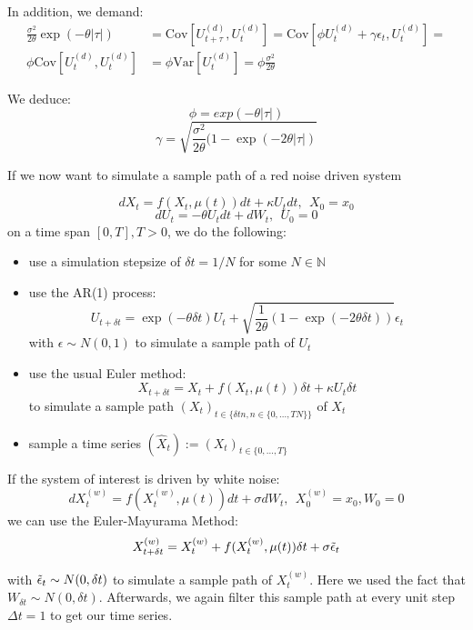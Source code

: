 \documentclass[%
thesis=student,%
coverpage=false,%
titlepage=false,%
headmarks=true, %
english,%
font=libertine, %
math=newpxtx, %
BCOR=5mm,%
coverBCOR=11mm%
]{tumbook}
\begin{document}
In addition, we demand: 
  \begin{align*} 
      \frac{\sigma ^2}{2\theta}\exp(-\theta\lvert \tau \rvert) &= \text{Cov}[U_{t+\tau} ^{(d)},U_{t} ^{(d)}] = \text{Cov}[\phi U_{t} ^{(d)} + \gamma \epsilon_{t}, U_{t}^{(d)}] = \\
      \phi\text{Cov}[U_{t}^{(d)},U_{t}^{(d)}] &= \phi \text{Var}[U_{t}^{(d)}] = \phi \frac{\sigma^2}{2\theta}
  \end{align*}




We deduce: 
    \[
        \phi = exp(-\theta \lvert \tau \rvert)
    \]
    \[
        \gamma = \sqrt{\frac{\sigma^{2}}{2\theta}(1-\exp(-2\theta \lvert \tau \rvert)}
    \]

If we now want to simulate a sample path of a red noise driven system

\[ 
     dX_{t} = f(X_{t},\mu(t))dt + \kappa U_{t}dt,\ \  X_{0} = x_{0}
\]
\[
     dU_{t} = -\theta U_{t}dt + dW_{t},\ \ U_{0} = 0
\]
on a time span $[0,T], T > 0$, we do the following: 
\begin{itemize}
    \item use a simulation stepsize of $\delta t = 1/N$ for some $N \in \mathbb{N}$
    \item use the AR(1) process:
    \[
    U_{t+\delta t} = \exp(-\theta \delta t)U_{t} + \sqrt{\frac{1}{2\theta}(1-\exp(-2\theta \delta t))}\epsilon_{t}
    \]
    with $\epsilon \sim N(0,1)$ to simulate a sample path of $U_{t}$
    \item use the usual Euler method:
    \[
        X_{t+\delta t} = X_{t} + f(X_{t},\mu(t))\delta t + \kappa U_{t}\delta t
    \]
    to simulate a sample path $(X_{t})_{t\in\{\delta t n, n \in \{0,...,TN\}\}}$ of $X_{t}$
    \item sample a time series $(\widehat{X}_t) := (X_t)_{t\in\{0,...,T\}}$
\end{itemize}


If the system of interest is driven by white noise: 
\[
    dX_{t}^{(w)} = f(X_{t}^{(w)},\mu(t))dt + \sigma dW_{t}, \ \ X_{0}^{(w)} = x_{0}, W_{0} = 0
\]
we can use the Euler-Mayurama Method:
\[
X_{t+\delta t}^{(w)} = X_{t}^{(w)} + f(X_{t}^{(w)},\mu(t))\delta t + \sigma\Tilde{\epsilon}_t
\]

with $\Tilde{\epsilon}_t \sim N(0,\delta t)$ to simulate a sample path of $X_{t}^{(w)}$. Here we used the fact that $W_{\delta t} \sim N(0,\delta t)$. Afterwards, we again filter this sample path at every unit step $\Delta t = 1$ to get our time series.
\end{document}
